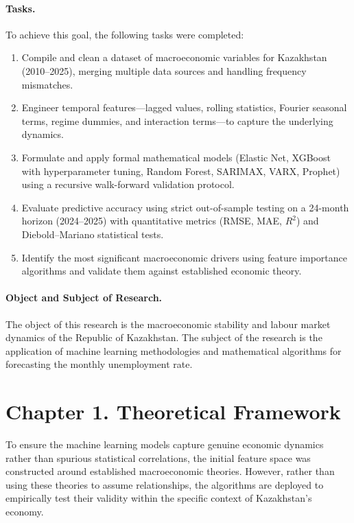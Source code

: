 \documentclass[14pt, a4paper]{extarticle}
\begin{document}
\paragraph{Tasks.}
To achieve this goal, the following tasks were completed:
\begin{enumerate}[nosep]
    \item Compile and clean a dataset of macroeconomic variables for Kazakhstan (2010--2025), merging multiple data sources and handling frequency mismatches.
    \item Engineer temporal features---lagged values, rolling statistics, Fourier seasonal terms, regime dummies, and interaction terms---to capture the underlying dynamics.
    \item Formulate and apply formal mathematical models (Elastic Net, XGBoost with hyperparameter tuning, Random Forest, SARIMAX, VARX, Prophet) using a recursive walk-forward validation protocol.
    \item Evaluate predictive accuracy using strict out-of-sample testing on a 24-month horizon (2024--2025) with quantitative metrics (RMSE, MAE, $R^2$) and Diebold--Mariano statistical tests.
    \item Identify the most significant macroeconomic drivers using feature importance algorithms and validate them against established economic theory.
\end{enumerate}

\paragraph{Object and Subject of Research.}
The object of this research is the macroeconomic stability and labour market dynamics of the Republic of Kazakhstan. The subject of the research is the application of machine learning methodologies and mathematical algorithms for forecasting the monthly unemployment rate.

\newpage
\section{Chapter 1. Theoretical Framework}

To ensure the machine learning models capture genuine economic dynamics rather than spurious statistical correlations, the initial feature space was constructed around established macroeconomic theories. However, rather than using these theories to assume relationships, the algorithms are deployed to empirically test their validity within the specific context of Kazakhstan's economy.
\end{document}
